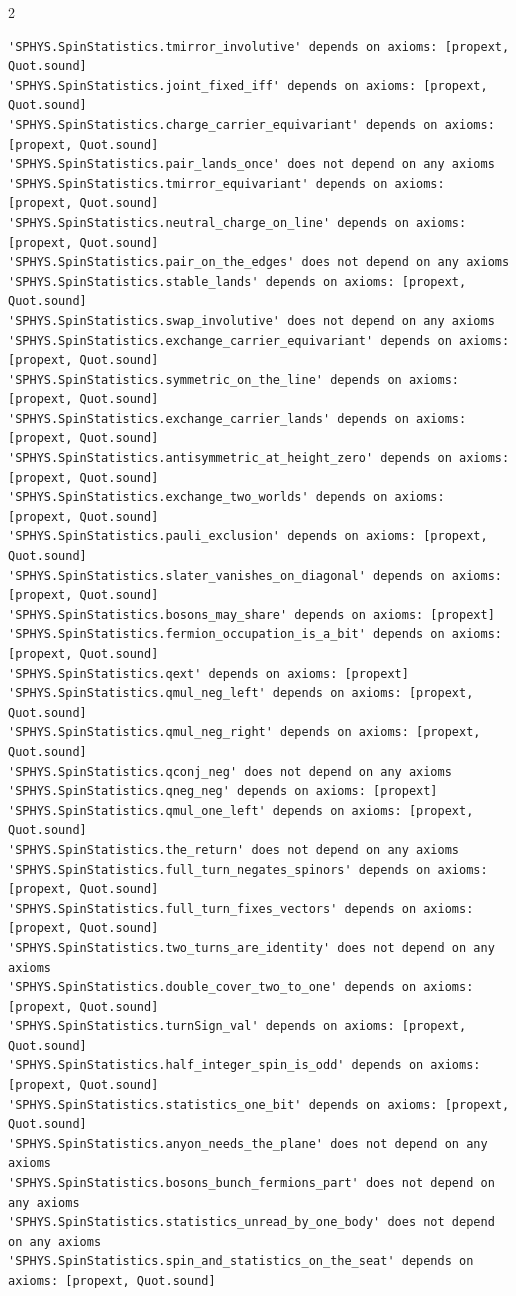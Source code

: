 \documentclass[10pt]{article}
\begin{document}
\begin{multicols}{2}
\begin{Verbatim}[fontsize=\fontsize{6.0}{6.9}\selectfont,breaklines,breakanywhere,breaksymbolleft={}]
'SPHYS.SpinStatistics.tmirror_involutive' depends on axioms: [propext, Quot.sound]
'SPHYS.SpinStatistics.joint_fixed_iff' depends on axioms: [propext, Quot.sound]
'SPHYS.SpinStatistics.charge_carrier_equivariant' depends on axioms: [propext, Quot.sound]
'SPHYS.SpinStatistics.pair_lands_once' does not depend on any axioms
'SPHYS.SpinStatistics.tmirror_equivariant' depends on axioms: [propext, Quot.sound]
'SPHYS.SpinStatistics.neutral_charge_on_line' depends on axioms: [propext, Quot.sound]
'SPHYS.SpinStatistics.pair_on_the_edges' does not depend on any axioms
'SPHYS.SpinStatistics.stable_lands' depends on axioms: [propext, Quot.sound]
'SPHYS.SpinStatistics.swap_involutive' does not depend on any axioms
'SPHYS.SpinStatistics.exchange_carrier_equivariant' depends on axioms: [propext, Quot.sound]
'SPHYS.SpinStatistics.symmetric_on_the_line' depends on axioms: [propext, Quot.sound]
'SPHYS.SpinStatistics.exchange_carrier_lands' depends on axioms: [propext, Quot.sound]
'SPHYS.SpinStatistics.antisymmetric_at_height_zero' depends on axioms: [propext, Quot.sound]
'SPHYS.SpinStatistics.exchange_two_worlds' depends on axioms: [propext, Quot.sound]
'SPHYS.SpinStatistics.pauli_exclusion' depends on axioms: [propext, Quot.sound]
'SPHYS.SpinStatistics.slater_vanishes_on_diagonal' depends on axioms: [propext, Quot.sound]
'SPHYS.SpinStatistics.bosons_may_share' depends on axioms: [propext]
'SPHYS.SpinStatistics.fermion_occupation_is_a_bit' depends on axioms: [propext, Quot.sound]
'SPHYS.SpinStatistics.qext' depends on axioms: [propext]
'SPHYS.SpinStatistics.qmul_neg_left' depends on axioms: [propext, Quot.sound]
'SPHYS.SpinStatistics.qmul_neg_right' depends on axioms: [propext, Quot.sound]
'SPHYS.SpinStatistics.qconj_neg' does not depend on any axioms
'SPHYS.SpinStatistics.qneg_neg' depends on axioms: [propext]
'SPHYS.SpinStatistics.qmul_one_left' depends on axioms: [propext, Quot.sound]
'SPHYS.SpinStatistics.the_return' does not depend on any axioms
'SPHYS.SpinStatistics.full_turn_negates_spinors' depends on axioms: [propext, Quot.sound]
'SPHYS.SpinStatistics.full_turn_fixes_vectors' depends on axioms: [propext, Quot.sound]
'SPHYS.SpinStatistics.two_turns_are_identity' does not depend on any axioms
'SPHYS.SpinStatistics.double_cover_two_to_one' depends on axioms: [propext, Quot.sound]
'SPHYS.SpinStatistics.turnSign_val' depends on axioms: [propext, Quot.sound]
'SPHYS.SpinStatistics.half_integer_spin_is_odd' depends on axioms: [propext, Quot.sound]
'SPHYS.SpinStatistics.statistics_one_bit' depends on axioms: [propext, Quot.sound]
'SPHYS.SpinStatistics.anyon_needs_the_plane' does not depend on any axioms
'SPHYS.SpinStatistics.bosons_bunch_fermions_part' does not depend on any axioms
'SPHYS.SpinStatistics.statistics_unread_by_one_body' does not depend on any axioms
'SPHYS.SpinStatistics.spin_and_statistics_on_the_seat' depends on axioms: [propext, Quot.sound]
\end{Verbatim}
\end{multicols}
\end{document}
